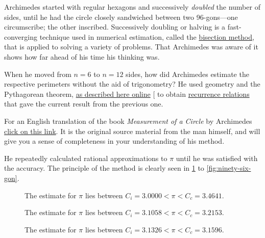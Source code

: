 \documentclass[
  a4paper,
]{article}
\begin{document}
Archimedes started with regular hexagons and successively \emph{doubled}
the number of sides, until he had the circle closely sandwiched between
two 96-gons---one circumscribe; the other inscribed. Successively
doubling or halving is a fast-converging technique used in numerical
estimation, called the
\href{https://en.wikipedia.org/wiki/Bisection_method}{bisection method},
that is applied to solving a variety of problems. That Archimedes was
aware of it shows how far ahead of his time his thinking was.

When he moved from \(n=6\) to \(n = 12\) sides, how did Archimedes
estimate the respective perimeters without the aid of trigonometry? He
used geometry and the Pythagorean theorem,
\href{https://nonagon.org/ExLibris/archimedes-pi}{as described here
online} {[}\citeproc{ref-bertrand2014}{1}{]} to obtain
\href{https://en.wikipedia.org/wiki/Recurrence_relation}{recurrence
relations} that gave the current result from the previous one.

For an English translation of the book \emph{Measurement of a Circle} by
Archimedes \href{auxiliary/Archimedes-Circle.pdf}{click on this link}.
It is the original source material from the man himself, and will give
you a sense of completeness in your understanding of his method.

He repeatedly calculated rational approximations to \(\pi\) until he was
satisfied with the accuracy. The principle of the method is clearly seen
in \cref{fig:six-gon} to \cref{fig:ninety-six-gon}.

\begin{figure}
\centering

\caption{The estimate for \(\pi\) lies between
\(C_i = 3.0000 < \pi < C_c = 3.4641\).}\label{fig:six-gon}
\end{figure}

\begin{figure}
\centering

\caption{The estimate for \(\pi\) lies between
\(C_i = 3.1058 < \pi < C_c = 3.2153\).}\label{fig:twelve-gon}
\end{figure}

\begin{figure}
\centering

\caption{The estimate for \(\pi\) lies between
\(C_i = 3.1326 < \pi < C_c = 3.1596\).}\label{fig:twenty-four-gon}
\end{figure}
\end{document}
